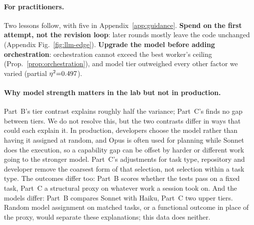 \documentclass{article}
\theoremstyle{remark}
\theoremstyle{plain}
\begin{document}
\paragraph{For practitioners.} Two lessons follow, with five in Appendix~\ref{app:guidance}. \textbf{Spend on the first attempt, not the revision loop}: later rounds mostly leave the code unchanged (Appendix Fig.~\ref{fig:llm-edge}). \textbf{Upgrade the model before adding orchestration}: orchestration cannot exceed the best worker's ceiling (Prop.~\ref{prop:orchestration}), and model tier outweighed every other factor we varied (partial $\eta^2{=}0.497$).

\paragraph{Why model strength matters in the lab but not in production.} Part~B's tier contrast explains roughly half the variance; Part~C's finds no gap between tiers. We do not resolve this, but the two contrasts differ in ways that could each explain it. In production, developers choose the model rather than having it assigned at random, and Opus is often used for planning while Sonnet does the execution, so a capability gap can be offset by harder or different work going to the stronger model. Part~C's adjustments for task type, repository and developer remove the coarsest form of that selection, not selection within a task type. The outcomes differ too: Part~B scores whether the tests pass on a fixed task, Part~C a structural proxy on whatever work a session took on. And the models differ: Part~B compares Sonnet with Haiku, Part~C two upper tiers. Random model assignment on matched tasks, or a functional outcome in place of the proxy, would separate these explanations; this data does neither.
\end{document}
